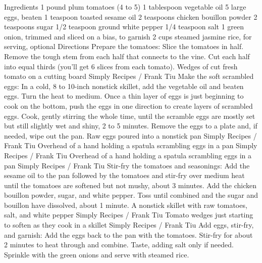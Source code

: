 Ingredients 1 pound plum tomatoes (4 to 5) 1 tablespoon vegetable oil 5 large eggs, beaten 1 teaspoon toasted sesame oil 2 teaspoons chicken bouillon powder 2 teaspoons sugar 1/2 teaspoon ground white pepper 1/4 teaspoon salt 1 green onion, trimmed and sliced on a bias, to garnish 2 cups steamed jasmine rice, for serving, optional Directions Prepare the tomatoes: Slice the tomatoes in half. Remove the tough stem from each half that connects to the vine. Cut each half into equal thirds (you’ll get 6 slices from each tomato). Wedges of cut fresh tomato on a cutting board Simply Recipes / Frank Tiu Make the soft scrambled eggs: In a cold, 8 to 10-inch nonstick skillet, add the vegetable oil and beaten eggs. Turn the heat to medium. Once a thin layer of eggs is just beginning to cook on the bottom, push the eggs in one direction to create layers of scrambled eggs. Cook, gently stirring the whole time, until the scramble eggs are mostly set but still slightly wet and shiny, 2 to 5 minutes. Remove the eggs to a plate and, if needed, wipe out the pan. Raw eggs poured into a nonstick pan Simply Recipes / Frank Tiu Overhead of a hand holding a spatula scrambling eggs in a pan Simply Recipes / Frank Tiu Overhead of a hand holding a spatula scrambling eggs in a pan Simply Recipes / Frank Tiu Stir-fry the tomatoes and seasonings: Add the sesame oil to the pan followed by the tomatoes and stir-fry over medium heat until the tomatoes are softened but not mushy, about 3 minutes. Add the chicken bouillon powder, sugar, and white pepper. Toss until combined and the sugar and bouillon have dissolved, about 1 minute. A nonstick skillet with raw tomatoes, salt, and white pepper Simply Recipes / Frank Tiu Tomato wedges just starting to soften as they cook in a skillet Simply Recipes / Frank Tiu Add eggs, stir-fry, and garnish: Add the eggs back to the pan with the tomatoes. Stir-fry for about 2 minutes to heat through and combine. Taste, adding salt only if needed. Sprinkle with the green onions and serve with steamed rice.
\par

